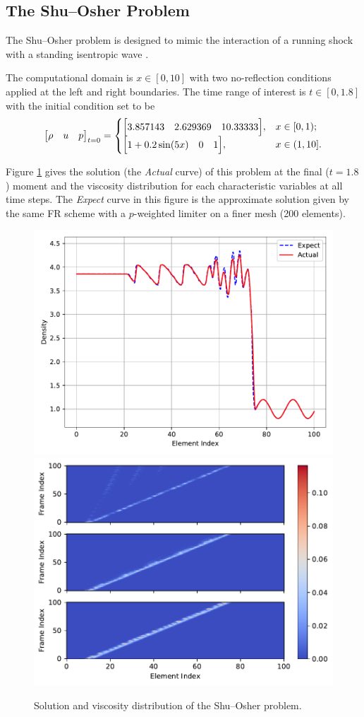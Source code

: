 \documentclass[10pt]{article}
\begin{document}
\subsection{The Shu--Osher Problem}\label{sec:shu_osher}

The Shu--Osher problem is designed to mimic the interaction of a running shock with a standing isentropic wave \cite{Shu_1989}.

The computational domain is $x\in[0, 10]$ with two no-reflection conditions applied at the left and right boundaries.
The time range of interest is $t\in[0, 1.8]$ with the initial condition set to be
\begin{equation}
\mqty[\rho & u & p]_{t=0}
=
\begin{cases}
\mqty[3.857143 & 2.629369 & 10.33333], &x\in[0,1);\\
\mqty[1+0.2\sin(5x) & 0 & 1], &x\in(1,10].
\end{cases}
\end{equation}

Figure \ref{fig:shu_osher} gives the solution (the \emph{Actual} curve) of this problem at the final ($t=1.8$) moment and the viscosity distribution for each characteristic variables at all time steps.
The \emph{Expect} curve in this figure is the approximate solution given by the same FR scheme with a $p$-weighted limiter \cite{Li_2020} on a finer mesh (200 elements).
\begin{figure}[H]
  \centering
  \includegraphics[width=.49\textwidth]{./shu_osher/Frame100.pdf}
  \includegraphics[width=.49\textwidth]{./shu_osher/Viscosity.pdf}
  \caption{Solution and viscosity distribution of the Shu--Osher problem.}
  \label{fig:shu_osher}
\end{figure}
\end{document}
